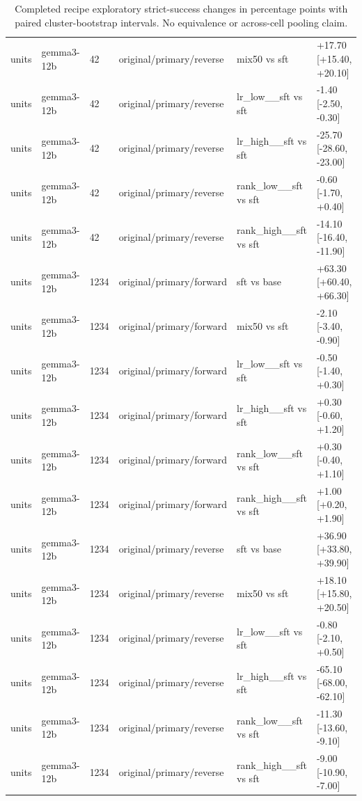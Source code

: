 \begin{table}[t]
\begin{tabular}{llllll}
units & gemma3-12b & 42 & original/primary/reverse & mix50 vs sft & +17.70 [+15.40, +20.10] \\
units & gemma3-12b & 42 & original/primary/reverse & lr\_low\_\_sft vs sft & -1.40 [-2.50, -0.30] \\
units & gemma3-12b & 42 & original/primary/reverse & lr\_high\_\_sft vs sft & -25.70 [-28.60, -23.00] \\
units & gemma3-12b & 42 & original/primary/reverse & rank\_low\_\_sft vs sft & -0.60 [-1.70, +0.40] \\
units & gemma3-12b & 42 & original/primary/reverse & rank\_high\_\_sft vs sft & -14.10 [-16.40, -11.90] \\
units & gemma3-12b & 1234 & original/primary/forward & sft vs base & +63.30 [+60.40, +66.30] \\
units & gemma3-12b & 1234 & original/primary/forward & mix50 vs sft & -2.10 [-3.40, -0.90] \\
units & gemma3-12b & 1234 & original/primary/forward & lr\_low\_\_sft vs sft & -0.50 [-1.40, +0.30] \\
units & gemma3-12b & 1234 & original/primary/forward & lr\_high\_\_sft vs sft & +0.30 [-0.60, +1.20] \\
units & gemma3-12b & 1234 & original/primary/forward & rank\_low\_\_sft vs sft & +0.30 [-0.40, +1.10] \\
units & gemma3-12b & 1234 & original/primary/forward & rank\_high\_\_sft vs sft & +1.00 [+0.20, +1.90] \\
units & gemma3-12b & 1234 & original/primary/reverse & sft vs base & +36.90 [+33.80, +39.90] \\
units & gemma3-12b & 1234 & original/primary/reverse & mix50 vs sft & +18.10 [+15.80, +20.50] \\
units & gemma3-12b & 1234 & original/primary/reverse & lr\_low\_\_sft vs sft & -0.80 [-2.10, +0.50] \\
units & gemma3-12b & 1234 & original/primary/reverse & lr\_high\_\_sft vs sft & -65.10 [-68.00, -62.10] \\
units & gemma3-12b & 1234 & original/primary/reverse & rank\_low\_\_sft vs sft & -11.30 [-13.60, -9.10] \\
units & gemma3-12b & 1234 & original/primary/reverse & rank\_high\_\_sft vs sft & -9.00 [-10.90, -7.00] \\
\bottomrule
\end{tabular}
\caption{Completed recipe exploratory strict-success changes in percentage points with paired cluster-bootstrap intervals. No equivalence or across-cell pooling claim.}
\end{table}
